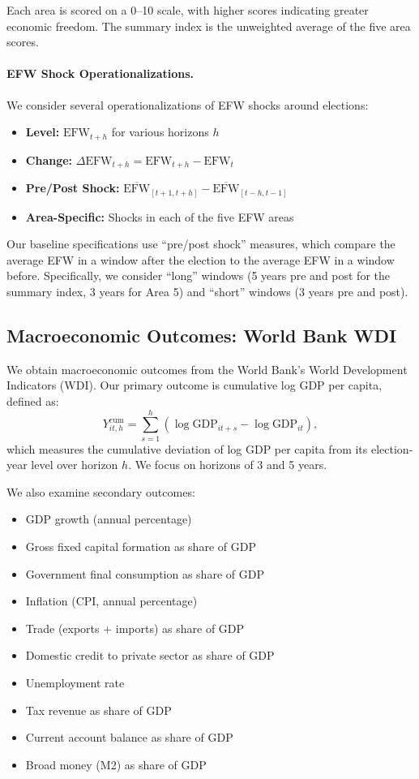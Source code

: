 \documentclass[12pt,a4paper]{article}
\newcommand{\efw}{\text{EFW}}
\begin{document}
Each area is scored on a 0--10 scale, with higher scores indicating 
greater economic freedom. The summary index is the unweighted average 
of the five area scores.

\paragraph{EFW Shock Operationalizations.}
We consider several operationalizations of EFW shocks around elections:
\begin{itemize}[noitemsep]
    \item \textbf{Level:} $\efw_{t+h}$ for various horizons $h$
    \item \textbf{Change:} $\Delta \efw_{t+h} = \efw_{t+h} - \efw_{t}$
    \item \textbf{Pre/Post Shock:} $\overline{\efw}_{[t+1, t+h]} - 
    \overline{\efw}_{[t-h, t-1]}$
    \item \textbf{Area-Specific:} Shocks in each of the five EFW areas
\end{itemize}

Our baseline specifications use ``pre/post shock'' measures, which 
compare the average EFW in a window after the election to the average 
EFW in a window before. Specifically, we consider ``long'' windows 
(5 years pre and post for the summary index, 3 years for Area 5) and 
``short'' windows (3 years pre and post).

\subsection{Macroeconomic Outcomes: World Bank WDI}

We obtain macroeconomic outcomes from the World Bank's World Development 
Indicators (WDI). Our primary outcome is cumulative log GDP per capita, 
defined as:
\begin{equation}
    Y^{\text{cum}}_{it,h} = \sum_{s=1}^{h} \left( \log \text{GDP}_{it+s} - 
    \log \text{GDP}_{it} \right),
\end{equation}
which measures the cumulative deviation of log GDP per capita from its 
election-year level over horizon $h$. We focus on horizons of 3 and 5 years.

We also examine secondary outcomes:
\begin{itemize}[noitemsep]
    \item GDP growth (annual percentage)
    \item Gross fixed capital formation as share of GDP
    \item Government final consumption as share of GDP
    \item Inflation (CPI, annual percentage)
    \item Trade (exports + imports) as share of GDP
    \item Domestic credit to private sector as share of GDP
    \item Unemployment rate
    \item Tax revenue as share of GDP
    \item Current account balance as share of GDP
    \item Broad money (M2) as share of GDP
\end{itemize}
\end{document}
